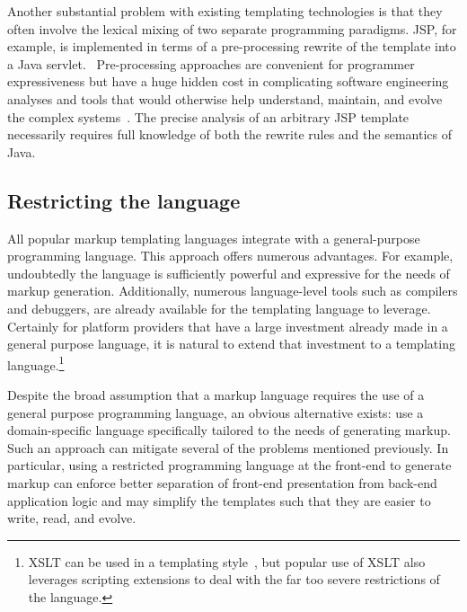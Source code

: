 \documentclass{www2003-submission}
\begin{document}
Another substantial problem with existing templating technologies is
that they often involve the lexical mixing of two separate programming
paradigms.  JSP, for example, is implemented in terms of a
pre-processing rewrite of the template into a Java servlet.~\cite{JavaServlet23}
Pre-processing approaches are convenient for programmer expressiveness
but have a huge hidden cost in complicating software engineering
analyses and tools that would otherwise help understand, maintain, and
evolve the complex systems~\cite{Badros00-spe,ErnstBadrosNotkin02}\cite[p.~424]{Stroustrup94}.
The precise analysis of an arbitrary JSP template necessarily requires
full knowledge of both the rewrite rules and the semantics of Java.

\subsection{Restricting the language}

All popular markup templating languages integrate with a
general-purpose programming language.  This approach offers numerous
advantages.  For example, undoubtedly the language is sufficiently
powerful and expressive for the needs of markup generation.
Additionally, numerous language-level tools such as compilers and
debuggers, are already available for the templating language to
leverage.  Certainly for platform providers that have a large
investment already made in a general purpose language, it is natural
to extend that investment to a templating language.\footnote{XSLT can
be used in a templating style~\cite[2.3]{XSLT}, but popular use of
XSLT also leverages scripting extensions to deal with the far too
severe restrictions of the language.}

Despite the broad assumption that a markup language requires the use
of a general purpose programming language, an obvious alternative
exists: use a domain-specific language specifically tailored to the
needs of generating markup.  Such an approach can mitigate several of
the problems mentioned previously.  In particular, using a restricted
programming language at the front-end to generate markup can enforce
better separation of front-end presentation from back-end application
logic and may simplify the templates such that they are easier to
write, read, and evolve.
\end{document}
